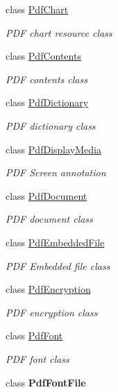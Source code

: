 \begin{DoxyCompactItemize}
class \hyperlink{class_pdf_file_writer_1_1_pdf_chart}{Pdf\+Chart}
\begin{DoxyCompactList}\small\item\em P\+DF chart resource class \end{DoxyCompactList}\item 
class \hyperlink{class_pdf_file_writer_1_1_pdf_contents}{Pdf\+Contents}
\begin{DoxyCompactList}\small\item\em P\+DF contents class \end{DoxyCompactList}\item 
class \hyperlink{class_pdf_file_writer_1_1_pdf_dictionary}{Pdf\+Dictionary}
\begin{DoxyCompactList}\small\item\em P\+DF dictionary class \end{DoxyCompactList}\item 
class \hyperlink{class_pdf_file_writer_1_1_pdf_display_media}{Pdf\+Display\+Media}
\begin{DoxyCompactList}\small\item\em P\+DF Screen annotation \end{DoxyCompactList}\item 
class \hyperlink{class_pdf_file_writer_1_1_pdf_document}{Pdf\+Document}
\begin{DoxyCompactList}\small\item\em P\+DF document class \end{DoxyCompactList}\item 
class \hyperlink{class_pdf_file_writer_1_1_pdf_embedded_file}{Pdf\+Embedded\+File}
\begin{DoxyCompactList}\small\item\em P\+DF Embedded file class \end{DoxyCompactList}\item 
class \hyperlink{class_pdf_file_writer_1_1_pdf_encryption}{Pdf\+Encryption}
\begin{DoxyCompactList}\small\item\em P\+DF encryption class \end{DoxyCompactList}\item 
class \hyperlink{class_pdf_file_writer_1_1_pdf_font}{Pdf\+Font}
\begin{DoxyCompactList}\small\item\em P\+DF font class \end{DoxyCompactList}\item 
class {\bfseries Pdf\+Font\+File}

\end{DoxyCompactItemize}
